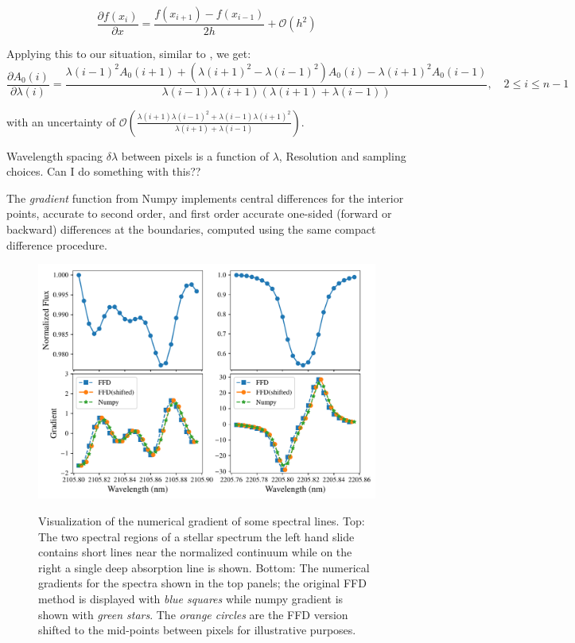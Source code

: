 \[\frac{\partial{f(x_i)}}{\partial{x}} = \frac{f\left(x_{i+1}\right) - f\left(x_{i-1}\right)}{2h} + \mathcal{O}\left(h^{2}\right)\]


Applying this to our situation, similar to , we get:
\[\frac{\partial A_0(i)}{\partial\lambda(i)} = \frac{{\lambda(i-1)}^{2} A_0(i+1) + ({\lambda(i+1)}^{2}-{\lambda(i-1)}^{2}) A_0(i) - {\lambda(i+1)}^{2} A_0(i-1)} {\lambda(i-1)\lambda(i+1)(\lambda(i+1) + \lambda(i-1))}, \hspace{1em} 2 \leq i \leq n-1\]

with an uncertainty of \(\mathcal{O}\left(\frac{\lambda(i+1){\lambda(i-1)}^{2} + \lambda(i-1){\lambda(i+1)}^{2}}{\lambda(i+1) + \lambda(i-1)}\right)\).


{\red{} Wavelength spacing \(\delta\lambda\) between pixels is a function of \(\lambda\), Resolution and sampling choices. Can I do something with this??}

The \emph{gradient} function from Numpy implements central differences for the interior points, accurate to second order, and first order accurate one-sided (forward or backward) differences at the boundaries, computed using the same compact difference procedure.

\begin{figure}
    \centering
   \includegraphics[width=0.8\linewidth]{figures/information-content/spectral_gradients}\\
    \caption{Visualization of the numerical gradient of some spectral lines. Top: The two spectral regions of a stellar spectrum the left hand slide contains short lines near the normalized continuum while on the right a single deep absorption line is shown. Bottom: The numerical gradients for the spectra shown in the top panels; the original FFD method is displayed  with \emph{blue squares} while numpy gradient is shown with \emph{green stars}. The \emph{orange circles} are the FFD version shifted to the mid-points between pixels for illustrative purposes.}
    \label{fig:gradients}
\end{figure}


